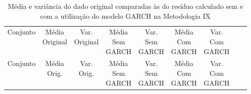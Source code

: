 \clearpage

\begin{center}
\begin{longtable}{ccccccccc}
\toprule
\rowcolor{white}
\caption[Metodologia IX: dados estatísticos]{Média e variância do dado original
comparadas às do resíduo calculado sem e com a utilização do modelo GARCH na
Metodologia IX} \label{tab:DadosEstatisticosMet9}\\
\midrule
    Conjunto & \specialcell{Média\\Original} &
    \specialcell{Var.\\Original} & \specialcell{Média\\Sem\\GARCH} &
    \specialcell{Var.\\Sem\\GARCH} & \specialcell{Média\\Com\\GARCH}&
    \specialcell{Var.\\Com\\GARCH} \\

\midrule
\endfirsthead 
\midrule
\rowcolor{white}
    Conjunto & \specialcell{Média\\Orig.} &
    \specialcell{Var.\\Orig.} & \specialcell{Média\\Sem\\GARCH} &
    \specialcell{Var.\\Sem\\GARCH} & \specialcell{Média\\Com\\GARCH}&
    \specialcell{Var.\\Com\\GARCH} \\


\end{longtable}
\end{center}
